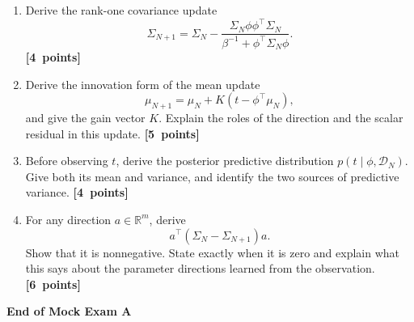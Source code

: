 \documentclass[11pt,a4paper]{article}
\newcommand{\points}[1]{\unskip\nobreak\hfill\mbox{\textbf{[#1 points]}}}
\begin{document}
\begin{enumerate}
  \item Derive the rank-one covariance update
  \[
    \Sigma_{N+1}=\Sigma_N-
    \frac{\Sigma_N\phi\phi^\top\Sigma_N}
    {\beta^{-1}+\phi^\top\Sigma_N\phi}.
  \]
  \points{4}
  \item Derive the innovation form of the mean update
  \[
    \mu_{N+1}=\mu_N+K(t-\phi^\top\mu_N),
  \]
  and give the gain vector $K$. Explain the roles of the direction and the scalar residual in this update. \points{5}
  \item Before observing $t$, derive the posterior predictive distribution $p(t\mid\phi,\mathcal{D}_N)$. Give both its mean and variance, and identify the two sources of predictive variance. \points{4}
  \item For any direction $a\in\mathbb{R}^m$, derive
  \[
    a^\top(\Sigma_N-\Sigma_{N+1})a.
  \]
  Show that it is nonnegative. State exactly when it is zero and explain what this says about the parameter directions learned from the observation. \points{6}
\end{enumerate}

\vfill
\begin{center}
  \textbf{End of Mock Exam A}
\end{center}
\end{document}
